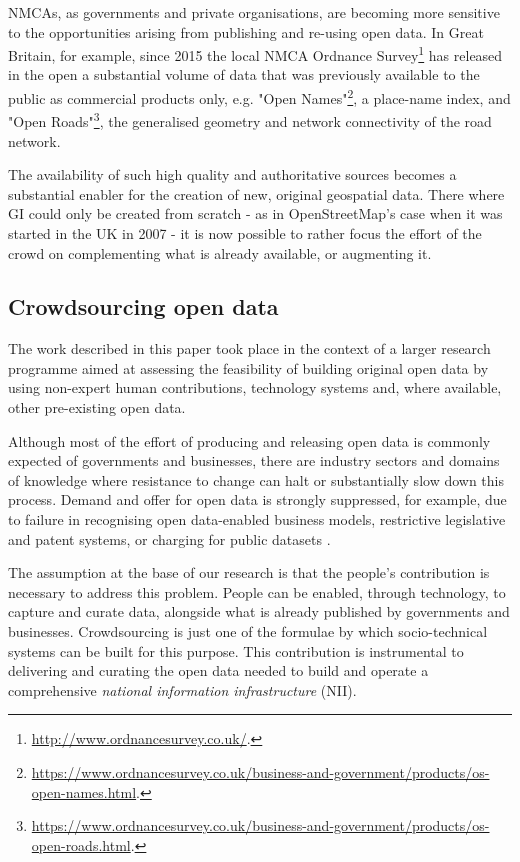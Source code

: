     NMCAs, as governments and private organisations, are becoming more sensitive to the opportunities arising from publishing and re-using open data. In Great Britain, for example, since 2015 the local NMCA Ordnance Survey\footnote{\url{http://www.ordnancesurvey.co.uk/}.} has released in the open a substantial volume of data that was previously available to the public as commercial products only, e.g. "Open Names"\footnote{\url{https://www.ordnancesurvey.co.uk/business-and-government/products/os-open-names.html}.}, a place-name index, and "Open Roads"\footnote{\url{https://www.ordnancesurvey.co.uk/business-and-government/products/os-open-roads.html}.}, the generalised geometry and network connectivity of the road network.
    
    The availability of such high quality and authoritative sources becomes a substantial enabler for the creation of new, original geospatial data. There where GI could only be created from scratch - as in OpenStreetMap's case when it was started in the UK in 2007 - it is now possible to rather focus the effort of the crowd on complementing what is already available, or augmenting it.

\subsection{Crowdsourcing open data}

    The work described in this paper took place in the context of a larger research programme aimed at assessing the feasibility of building original open data by using non-expert human contributions, technology systems and, where available, other pre-existing open data. 
    
    Although most of the effort of producing and releasing open data is commonly expected of governments and businesses, there are industry sectors and domains of knowledge where resistance to change can halt or substantially slow down this process. Demand and offer for open data is strongly suppressed, for example, due to failure in recognising open data-enabled business models, restrictive legislative and patent systems, or charging for public datasets \cite{shadboltpaf}. 
    
    The assumption at the base of our research is that the people's contribution is necessary to address this problem. People can be enabled, through technology, to capture and curate data, alongside what is already published by governments and businesses. Crowdsourcing is just one of the formulae by which socio-technical systems can be built for this purpose. This contribution is instrumental to delivering and curating the open data needed to build and operate a comprehensive {\it national information infrastructure} (NII).

